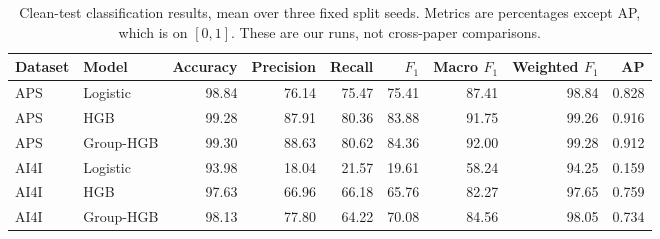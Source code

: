 \begin{table}[t]
\centering\caption{Clean-test classification results, mean over three fixed split seeds. Metrics are percentages except AP, which is on $[0,1]$. These are our runs, not cross-paper comparisons.}
\label{tab:clean}\small
\begin{tabular}{llrrrrrrr}\hline
Dataset & Model & Accuracy & Precision & Recall & $F_1$ & Macro $F_1$ & Weighted $F_1$ & AP\\\hline
APS & Logistic & 98.84 & 76.14 & 75.47 & 75.41 & 87.41 & 98.84 & 0.828\\
APS & HGB & 99.28 & 87.91 & 80.36 & 83.88 & 91.75 & 99.26 & 0.916\\
APS & Group-HGB & 99.30 & 88.63 & 80.62 & 84.36 & 92.00 & 99.28 & 0.912\\
AI4I & Logistic & 93.98 & 18.04 & 21.57 & 19.61 & 58.24 & 94.25 & 0.159\\
AI4I & HGB & 97.63 & 66.96 & 66.18 & 65.76 & 82.27 & 97.65 & 0.759\\
AI4I & Group-HGB & 98.13 & 77.80 & 64.22 & 70.08 & 84.56 & 98.05 & 0.734\\
\hline\end{tabular}\end{table}
